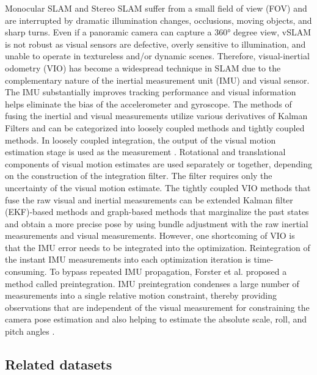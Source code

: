 \documentclass[letterpaper, 10 pt, conference]{ieeeconf}  %
\begin{document}
Monocular SLAM and Stereo SLAM suffer from a small field of view (FOV) and are interrupted by dramatic illumination changes, occlusions, moving objects, and sharp turns. Even if a panoramic camera can capture a 360° degree view, vSLAM is not robust as visual sensors are defective, overly sensitive to illumination, and unable to operate in textureless and/or dynamic scenes. Therefore, visual-inertial odometry (VIO) has become a widespread technique in SLAM due to the complementary nature of the inertial measurement unit (IMU) and visual sensor. The IMU substantially improves tracking performance \cite{8} and visual information helps eliminate the bias of the accelerometer and gyroscope. The methods of fusing the inertial and visual measurements utilize various derivatives of Kalman Filters and can be categorized into loosely coupled methods and tightly coupled methods. In loosely coupled integration, the output of the visual motion estimation stage is used as the measurement \cite{12}. Rotational and translational components of visual motion estimates are used separately or together, depending on the construction of the integration filter. The filter requires only the uncertainty of the visual motion estimate. The tightly coupled VIO methods that fuse the raw visual and inertial measurements can be extended Kalman filter (EKF)-based methods and graph-based methods that marginalize the past states and obtain a more precise pose by using bundle adjustment with the raw inertial measurements and visual measurements. However, one shortcoming of VIO is that the IMU error needs to be integrated into the optimization. Reintegration of the instant IMU measurements into each optimization iteration is time-consuming. To bypass repeated IMU propagation, Forster et al. \cite{12} proposed a method called preintegration. IMU preintegration condenses a large number of measurements into a single relative motion constraint, thereby providing observations that are independent of the visual measurement for constraining the camera pose estimation and also helping to estimate the absolute scale, roll, and pitch angles \cite{3}. 

\subsection{Related datasets}
\end{document}
